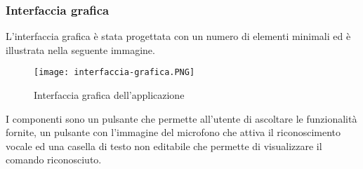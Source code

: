 		\subsubsection{Interfaccia grafica}
		L'interfaccia grafica è stata progettata con un numero di elementi minimali ed è illustrata nella seguente immagine.
		\begin{figure}[htbp]
			\begin{center}
				\texttt{[image: interfaccia-grafica.PNG]}
				\caption{Interfaccia grafica dell'applicazione}
			\end{center}
		\end{figure}
	
		I componenti sono un pulsante che permette all'utente di ascoltare le funzionalità fornite, un pulsante con l'immagine del microfono che attiva il riconoscimento vocale ed una casella di testo non editabile che permette di visualizzare il comando riconosciuto.		
